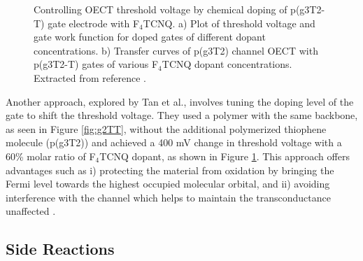  \begin{figure}[ht]
	\centering
	\hspace{2em}
	\caption[Tuning of threshold voltage with different levels of doping p(g3T2-T)]{Controlling OECT threshold voltage by chemical doping of p(g3T2-T) gate electrode with F$_{4}$TCNQ. a) Plot of threshold voltage and gate work function for doped gates of different dopant concentrations. b) Transfer curves of p(g3T2) channel OECT %
	with p(g3T2-T) gates of various F$_{4}$TCNQ dopant concentrations. Extracted from reference \cite{tanTuningOrganicElectrochemical2022}.}
	\label{fig:tune}
\end{figure}

Another approach, explored by Tan et al., involves tuning the doping level of the gate to shift the threshold voltage. They used a polymer with the same backbone, as seen in Figure \ref{fig:g2TT}, without the additional polymerized thiophene molecule (p(g3T2)) and achieved a 400 mV change in threshold voltage with a 60\% molar ratio of %
F$_{4}$TCNQ dopant, as shown in Figure \ref{fig:tune}. This approach offers advantages such as i) protecting the material from oxidation by bringing the Fermi level towards the highest occupied molecular orbital, and ii) avoiding interference with the channel which helps to maintain the transconductance unaffected \cite{tanTuningOrganicElectrochemical2022}.


\subsection{Side Reactions} \label{subsec:sidereac}

